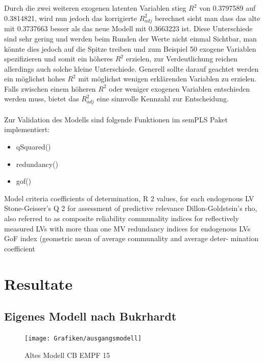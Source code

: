 \documentclass{article}\usepackage[]{graphicx}\usepackage[]{color}
\begin{document}
Durch die zwei weiteren exogenen latenten Variablen stieg $R^{2}$ von 0.3797589 auf 0.3814821, wird nun jedoch das korrigierte $R^{2}_{adj}$ berechnet sieht man dass das alte mit 0.3737663 besser als das neue Modell mit 0.3663223 ist. Diese Unterschiede sind sehr gering und werden beim Runden der Werte nicht einmal Sichtbar, man könnte dies jedoch auf die Spitze treiben und zum Beispiel 50 exogene Variablen spezifizieren und somit ein höheres $R^{2}$ erzielen, zur Verdeutlichung reichen allerdings auch solche kleine Unterschiede. Generell sollte darauf geachtet werden ein möglichst hohes $R^{2}$ mit möglichst wenigen erklärenden Variablen zu erzielen. Falls zwischen einem höheren $R^{2}$ oder weniger exogenen Variablen entschieden werden muss, bietet das $R^{2}_{adj}$ eine sinnvolle Kennzahl zur Entscheidung.

\paragraph{}



Zur Validation des Modells sind folgende Funktionen im semPLS Paket implementiert:
\begin{itemize}
\item qSquared()
\item redundancy()
\item gof()
\end{itemize}

Model criteria
coefficients of determination, R 2 values, for each endogenous LV
Stone-Geisser’s Q 2 for assessment of predictive relevance
Dillon-Goldstein’s rho, also referred to as composite reliability
communality indices for reflectively measured LVs with more than one MV
redundancy indices for endogenous LVs
GoF index (geometric mean of average communality and average deter-
mination coefficient




\newpage
\section{Resultate}%
\subsection{Eigenes Modell nach Bukrhardt}



\begin{figure}[h!]
\centering
\hspace*{-4.8cm}\texttt{[image: Grafiken/ausgangsmodell]}
\caption{Altes Modell CB EMPF 15}
\label{ausgangsmodell}
\end{figure}
\end{document}
